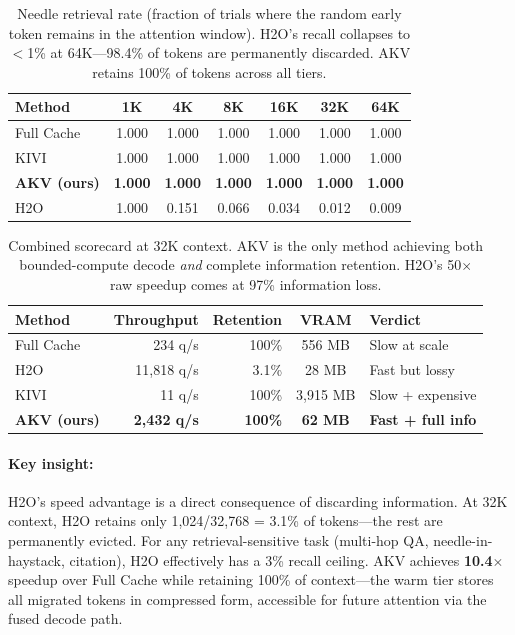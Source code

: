 \documentclass[11pt,a4paper]{article}
\begin{document}
\begin{table}[h]
\centering
\begin{tabular}{lcccccc}
\toprule
\textbf{Method} & \textbf{1K} & \textbf{4K} & \textbf{8K} & \textbf{16K} & \textbf{32K} & \textbf{64K} \\
\midrule
Full Cache & 1.000 & 1.000 & 1.000 & 1.000 & 1.000 & 1.000 \\
KIVI & 1.000 & 1.000 & 1.000 & 1.000 & 1.000 & 1.000 \\
\textbf{AKV (ours)} & \textbf{1.000} & \textbf{1.000} & \textbf{1.000} & \textbf{1.000} & \textbf{1.000} & \textbf{1.000} \\
H2O & 1.000 & 0.151 & 0.066 & 0.034 & 0.012 & 0.009 \\
\bottomrule
\end{tabular}
\caption{Needle retrieval rate (fraction of trials where the random early token remains in the attention window). H2O's recall collapses to $<$1\% at 64K---98.4\% of tokens are permanently discarded. AKV retains 100\% of tokens across all tiers.}
\label{tab:needle_retrieval}
\end{table}

\begin{table}[h]
\centering
\begin{tabular}{lrrcl}
\toprule
\textbf{Method} & \textbf{Throughput} & \textbf{Retention} & \textbf{VRAM} & \textbf{Verdict} \\
\midrule
Full Cache & 234 q/s & 100\% & 556 MB & Slow at scale \\
H2O & 11,818 q/s & 3.1\% & 28 MB & Fast but lossy \\
KIVI & 11 q/s & 100\% & 3,915 MB & Slow + expensive \\
\textbf{AKV (ours)} & \textbf{2,432 q/s} & \textbf{100\%} & \textbf{62 MB} & \textbf{Fast + full info} \\
\bottomrule
\end{tabular}
\caption{Combined scorecard at 32K context. AKV is the only method achieving both bounded-compute decode \textit{and} complete information retention. H2O's 50$\times$ raw speedup comes at 97\% information loss.}
\label{tab:scorecard}
\end{table}

\paragraph{Key insight:} H2O's speed advantage is a direct consequence of discarding information. At 32K context, H2O retains only 1,024/32,768 = 3.1\% of tokens---the rest are permanently evicted. For any retrieval-sensitive task (multi-hop QA, needle-in-haystack, citation), H2O effectively has a 3\% recall ceiling. AKV achieves \textbf{10.4$\times$} speedup over Full Cache while retaining 100\% of context---the warm tier stores all migrated tokens in compressed form, accessible for future attention via the fused decode path.
\end{document}
